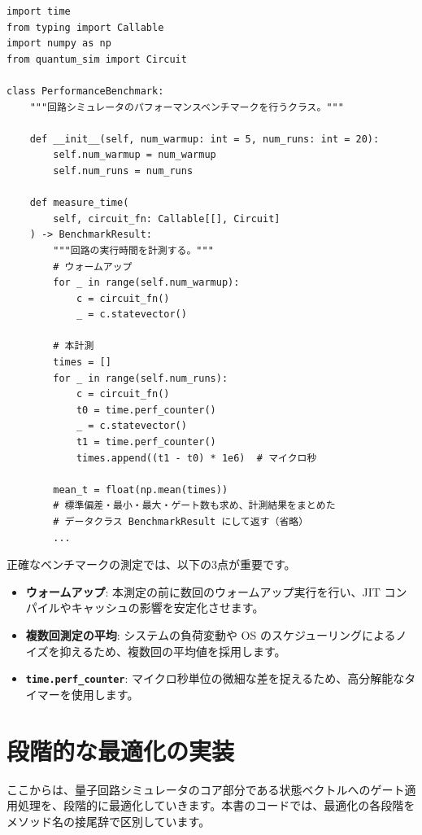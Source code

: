 \begin{lstlisting}[caption=ベンチマーク計測クラス（performance.py、抜粋）, label=src:measure_time]
import time
from typing import Callable
import numpy as np
from quantum_sim import Circuit

class PerformanceBenchmark:
    """回路シミュレータのパフォーマンスベンチマークを行うクラス。"""

    def __init__(self, num_warmup: int = 5, num_runs: int = 20):
        self.num_warmup = num_warmup
        self.num_runs = num_runs

    def measure_time(
        self, circuit_fn: Callable[[], Circuit]
    ) -> BenchmarkResult:
        """回路の実行時間を計測する。"""
        # ウォームアップ
        for _ in range(self.num_warmup):
            c = circuit_fn()
            _ = c.statevector()

        # 本計測
        times = []
        for _ in range(self.num_runs):
            c = circuit_fn()
            t0 = time.perf_counter()
            _ = c.statevector()
            t1 = time.perf_counter()
            times.append((t1 - t0) * 1e6)  # マイクロ秒

        mean_t = float(np.mean(times))
        # 標準偏差・最小・最大・ゲート数も求め、計測結果をまとめた
        # データクラス BenchmarkResult にして返す（省略）
        ...
\end{lstlisting}

正確なベンチマークの測定では、以下の3点が重要です。

\begin{itemize}
\item \textbf{ウォームアップ}: 本測定の前に数回のウォームアップ実行を行い、JIT コンパイルやキャッシュの影響を安定化させます。
\item \textbf{複数回測定の平均}: システムの負荷変動や OS のスケジューリングによるノイズを抑えるため、複数回の平均値を採用します。
\item \texttt{\textbf{time.perf\_counter}}: マイクロ秒単位の微細な差を捉えるため、高分解能なタイマーを使用します。
\end{itemize}

\section{段階的な最適化の実装}

ここからは、量子回路シミュレータのコア部分である状態ベクトルへのゲート適用処理を、段階的に最適化していきます。本書のコードでは、最適化の各段階をメソッド名の接尾辞で区別しています。

